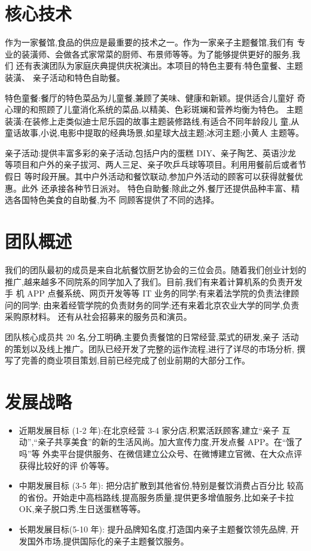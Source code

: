 \section{核心技术}
作为一家餐馆,食品的供应是最重要的技术之一。作为一家亲子主题餐馆,我们有
专业的装潢师、会做各式家常菜的厨师、布景师等等。为了能够提供更好的服务,我们
还有表演团队为家庭庆典提供庆祝演出。本项目的特色主要有:特色童餐、主题装潢、
亲子活动和特色自助餐。

特色童餐:餐厅的特色菜品为儿童餐,兼顾了美味、健康和新颖。提供适合儿童好
奇心理的和照顾了儿童消化系统的菜品,以精美、色彩斑斓和营养均衡为特色。
主题装潢:在装修上走类似迪士尼乐园的故事主题装修路线,有适合不同年龄段儿
童,从童话故事,小说,电影中提取的经典场景,如星球大战主题;冰河主题;小黄人
主题等。

亲子活动:提供丰富多彩的亲子活动,包括户内的蛋糕 DIY、亲子陶艺、英语沙龙
等项目和户外的亲子拔河、两人三足、亲子吹乒乓球等项目。利用用餐前后或者节假日
等时段开展。其中户外活动和餐饮联动,参加户外活动的顾客可以获得就餐优惠。此外
还承接各种节日派对。
特色自助餐:除此之外,餐厅还提供品种丰富、精选各国特色美食的自助餐,为不
同顾客提供了不同的选择。

\section{团队概述}
我们的团队最初的成员是来自北航餐饮厨艺协会的三位会员。随着我们创业计划的
推广,越来越多不同院系的同学加入了我们。目前,我们有来着计算机系的负责开发手
机 APP 点餐系统、网页开发等等 IT 业务的同学;有来着法学院的负责法律顾问的同学;
由来着经管学院的负责财务的同学;还有来着北京农业大学的同学,负责采购原材料。
还有从社会招募来的服务员和演员。

团队核心成员共 20 名,分工明确,主要负责餐馆的日常经营,菜式的研发,亲子
活动的策划以及线上推广。团队已经开发了完整的运作流程,进行了详尽的市场分析,
撰写了完善的商业项目策划,目前已经完成了创业前期的大部分工作。

\section{发展战略}
\begin{itemize}
\item 近期发展目标 (1-2 年):在北京经营 3-4 家分店,积累活跃顾客,建立“亲子
互动”,“亲子共享美食”的新的生活风尚。加大宣传力度,开发点餐 APP。在“饿了吗”等
外卖平台提供服务、在微信建立公众号、在微博建立官微、在大众点评获得比较好的评
价等等。
\item 中期发展目标 (3-5 年): 把分店扩散到其他省份,特别是餐饮消费占百分比
较高的省份。开始走中高档路线,提高服务质量,提供更多增值服务,比如亲子卡拉
OK,亲子脱口秀,生日送蛋糕等等。
\item 长期发展目标(5-10 年): 提升品牌知名度,打造国内亲子主题餐饮领先品牌,
开发国外市场,提供国际化的亲子主题餐饮服务。
\end{itemize}

